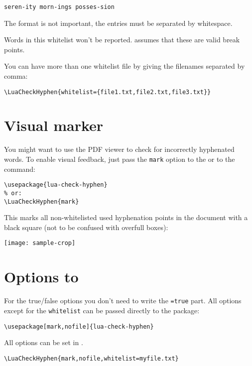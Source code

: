 \documentclass{ltxdockit}
\begin{document}
\begin{verbatim}
seren-ity morn-ings posses-sion
\end{verbatim}

The format is not important, the entries must be separated by whitespace.

Words in this whitelist won't be reported.  assumes that these are valid break points.

You can have more than one whitelist file by giving the filenames separated by comma:

\begin{verbatim}
\LuaCheckHyphen{whitelist={file1.txt,file2.txt,file3.txt}}
\end{verbatim}

\section{Visual marker}

You might want to use the PDF viewer to check for incorrectly hyphenated words. To enable visual feedback, just pass the \texttt{mark} option to the  or to the  command:

\begin{verbatim}
\usepackage{lua-check-hyphen}
% or:
\LuaCheckHyphen{mark}
\end{verbatim}

This marks all non-whitelisted used hyphenation points in the document with a black square (not to be confused with overfull boxes): 

\texttt{[image: sample-crop]}

\section{Options to }

For the true/false options you don't need to write the \texttt{=true} part. All options except for the \texttt{whitelist} can be passed directly to the package:

\begin{verbatim}
\usepackage[mark,nofile]{lua-check-hyphen}
\end{verbatim}

\noindent All options can be set in .

\begin{verbatim}
\LuaCheckHyphen{mark,nofile,whitelist=myfile.txt}
\end{verbatim}
\end{document}

